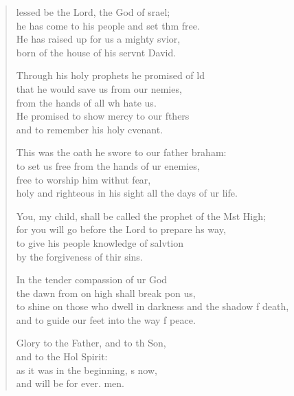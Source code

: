 \begin{verse}
  \begin{patverse}
lessed be the Lord, the God of srael;\Med\\
he has come to his people and set thm free.\\
He has raised up for us a mighty svior,\Med\\
born of the house of his servnt David.

Through his holy prophets he promised of ld\Flex\\
that he would save us from our nemies,\Med\\
from the hands of all wh hate us.\\
He promised to show mercy to our fthers\Med\\
and to remember his holy cvenant.

This was the oath he swore to our father braham:\Med\\
to set us free from the hands of ur enemies,\\
free to worship him withut fear,\Med\\
holy and righteous in his sight all the days of ur life.

You, my child, shall be called the prophet of the Mst High;\Med\\
for you will go before the Lord to prepare h\pointup{\i}s way,\\
to give his people knowledge of salvtion\Med\\
by the forgiveness of thir sins.

In the tender compassion of ur God\Med\\
the dawn from on high shall break pon us,\\
to shine on those who dwell in darkness and the shadow f death,\Med\\
and to guide our feet into the way f peace.

Glory to the Father, and to th Son,\Med\\
and to the Hol Spirit:\\
as it was in the beginning, \pointup{\i}s now,\Med\\
and will be for ever. men.
  \end{patverse}
  \end{verse}
